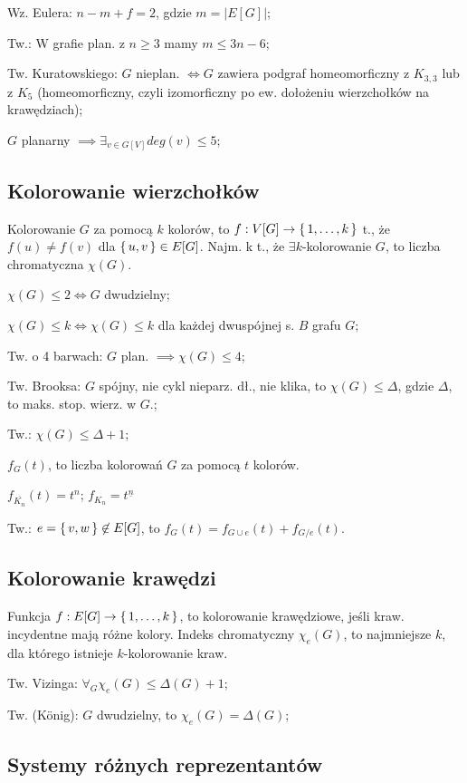\documentclass[10pt,a4paper,twocolumn]{article}
\begin{document}
Wz. Eulera: $n - m + f = 2$, gdzie $m = |E[G]|$;

Tw.: W grafie plan. z $n \geq 3$ mamy $m \leq 3n -6$;

Tw. Kuratowskiego: $G$ nieplan. $\iff G$ zawiera podgraf homeomorficzny
  z $K_{3,3}$ lub z $K_5$ (homeomorficzny, czyli
  izomorficzny po ew. dołożeniu wierzchołków na krawędziach);

$G$ planarny $\implies \exists_{v \in G[V]} deg(v) \leq 5$;

\subsection{Kolorowanie wierzchołków}

Kolorowanie $G$ za pomocą $k$ kolorów, to
  $f: V[G] \rightarrow \set{1, \dots, k}$ t., że $f(u) \neq f(v)$ dla
  $\set{u, v} \in E[G]$. Najm. k t., że $\exists k$-kolorowanie $G$, to liczba
  chromatyczna $\chi (G)$.

$\chi(G) \leq 2 \Leftrightarrow G$ dwudzielny;

$\chi(G) \leq k \Leftrightarrow \chi(G) \leq k$ dla każdej dwuspójnej s. $B$
  grafu $G$;

Tw. o 4 barwach: $G$ plan. $\implies\chi(G)\leq 4$;

Tw. Brooksa: $G$ spójny, nie cykl nieparz. dł., nie klika, to
  $\chi(G) \leq \Delta$, gdzie $\Delta$, to maks. stop. wierz. w $G$.;

Tw.: $\chi(G) \leq \Delta + 1$;

$f_G(t)$, to liczba kolorowań $G$ za pomocą $t$ kolorów.

$f_{\overline{K_n}}(t) = t^n$; $f_{K_n} = t^{\underline{n}}$

Tw.: $e = \set{v, w} \not\in E[G]$, to $f_G(t)=f_{G\cup e}(t) + f_{G/e}(t)$.

\subsection{Kolorowanie krawędzi}

Funkcja $f: E[G] \rightarrow \set{1, \dots, k}$, to kolorowanie krawędziowe,
  jeśli kraw. incydentne mają różne kolory. Indeks chromatyczny $\chi_e(G)$, to
  najmniejsze $k$, dla którego istnieje $k$-kolorowanie kraw.

Tw. Vizinga: $\forall_G \chi_e(G) \leq \Delta(G) +1$;

Tw. (K{\"o}nig): $G$ dwudzielny, to $\chi_e(G) = \Delta(G)$;

\subsection{Systemy różnych reprezentantów}
\end{document}
